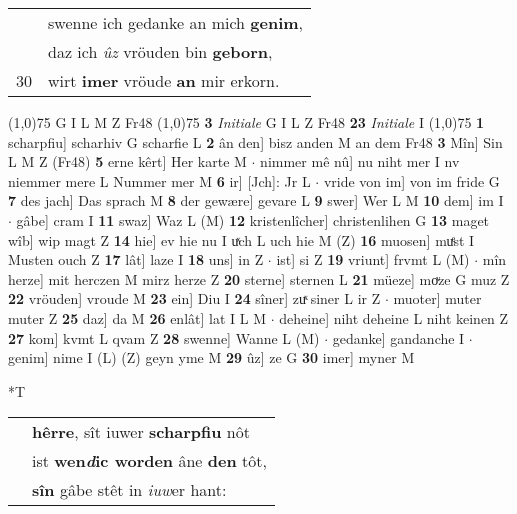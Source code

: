 \documentclass[8pt,a4paper,notitlepage]{article}
\begin{document}
\begin{table}[ht]
\begin{minipage}[t]{0.5\linewidth}
\begin{tabular}{rl}
 & swenne ich gedanke an mich \textbf{genim},\\ 
 & daz ich \textit{ûz} vröuden bin \textbf{geborn},\\ 
30 & wirt \textbf{imer} vröude \textbf{an} mir erkorn.\\ 
\end{tabular}
\scriptsize
\line(1,0){75} \newline
G I L M Z Fr48 \newline
\line(1,0){75} \newline
\textbf{3} \textit{Initiale} G I L Z Fr48  \textbf{23} \textit{Initiale} I  \newline
\line(1,0){75} \newline
\textbf{1} scharpfiu] scharhiv G scharfie L \textbf{2} ân den] bisz anden M an dem Fr48 \textbf{3} Mîn] Sin L M Z (Fr48) \textbf{5} erne kêrt] Her karte M  $\cdot$ nimmer mê nû] nu niht mer I nv niemmer mere L Nummer mer M \textbf{6} ir] [Jch]: Jr L  $\cdot$ vride von im] von im fride G \textbf{7} des jach] Das sprach M \textbf{8} der gewære] gevare L \textbf{9} swer] Wer L M \textbf{10} dem] im I  $\cdot$ gâbe] cram I \textbf{11} swaz] Waz L (M) \textbf{12} kristenlîcher] christenlihen G \textbf{13} maget wîb] wip magt Z \textbf{14} hie] ev hie nu I uͯch L uch hie M (Z) \textbf{16} muosen] muͤst I Musten ouch Z \textbf{17} lât] laze I \textbf{18} uns] in Z  $\cdot$ ist] si Z \textbf{19} vriunt] frvmt L (M)  $\cdot$ mîn herze] mit herczen M mirz herze Z \textbf{20} sterne] sternen L \textbf{21} müeze] moͮze G muz Z \textbf{22} vröuden] vroude M \textbf{23} ein] Diu I \textbf{24} sîner] zuͯ siner L ir Z  $\cdot$ muoter] muter muter Z \textbf{25} daz] da M \textbf{26} enlât] lat I L M  $\cdot$ deheine] niht deheine L niht keinen Z \textbf{27} kom] kvmt L qvam Z \textbf{28} swenne] Wanne L (M)  $\cdot$ gedanke] gandanche I  $\cdot$ genim] nime I (L) (Z) geyn yme M \textbf{29} ûz] ze G \textbf{30} imer] myner M \newline
\end{minipage}
\hspace{0.5cm}
\begin{minipage}[t]{0.5\linewidth}
\small
\begin{center}*T
\end{center}
\begin{tabular}{rl}
 & \textbf{hêrre}, sît iuwer \textbf{scharpfiu} nôt\\ 
 & ist \textbf{wen\textit{d}ic worden} âne \textbf{den} tôt,\\ 
 & \textbf{sîn} gâbe stêt in \textit{iuw}er hant:\\ 

\end{tabular}
\end{minipage}
\end{table}
\end{document}
